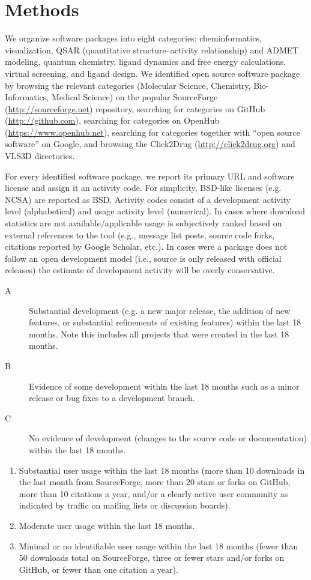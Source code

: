 \section{Methods}

We organize software packages into eight categories: cheminformatics, visualization, QSAR (quantitative structure–activity relationship) and ADMET modeling, quantum chemistry, ligand dynamics and free energy calculations, virtual screening, and ligand design.
We identified open source software package by browsing the relevant categories (Molecular Science, Chemistry, Bio-Informatics, Medical Science) on the popular SourceForge (\url{http://sourceforge.net}) repository, searching for categories on GitHub (\url{http://github.com}), searching for categories on OpenHub (\url{https://www.openhub.net}), searching for categories together with ``open source software'' on Google, and browsing the Click2Drug (\url{http://click2drug.org}) and VLS3D \cite{Villoutreix_2013} directories.

For every identified software package, we report its primary URL and software license and assign it an activity code. For simplicity, BSD-like licenses (e.g. NCSA) are reported as BSD. Activity codes consist of a development activity level (alphabetical) and usage activity level (numerical). In cases where download statistics are not available/applicable usage is subjectively ranked based on external references to the tool (e.g., message list posts, source code forks, citations reported by Google Scholar, etc.).  In cases were a package does not follow an open development model (i.e., source is only released with official releases) the estimate of development activity will be overly conservative.

\begin{description}
  \item[A] Substantial development (e.g. a new major release, the addition of new features, or substantial refinements of existing features) within the last 18 months. Note this includes all projects that were created in the last 18 months.
  \item[B] Evidence of some development within the last 18 months such as a minor release or bug fixes to a development branch.
  \item[C] No evidence of development (changes to the source code or documentation) within the last 18 months. 
\end{description}
\begin{enumerate}
  \item Substantial user usage within the last 18 months (more than 10 downloads in the last month from SourceForge, more than 20 stars or forks on GitHub, more than 10 citations a year, and/or a clearly active user community as indicated by traffic on mailing lists or discussion boards).
  \item Moderate user usage within the last 18 months.
    \item Minimal or no identifiable user usage within the last 18 months (fewer than 50 downloads total on SourceForge, three or fewer stars and/or forks on GitHub, or fewer than one citation a year).
\end{enumerate}

